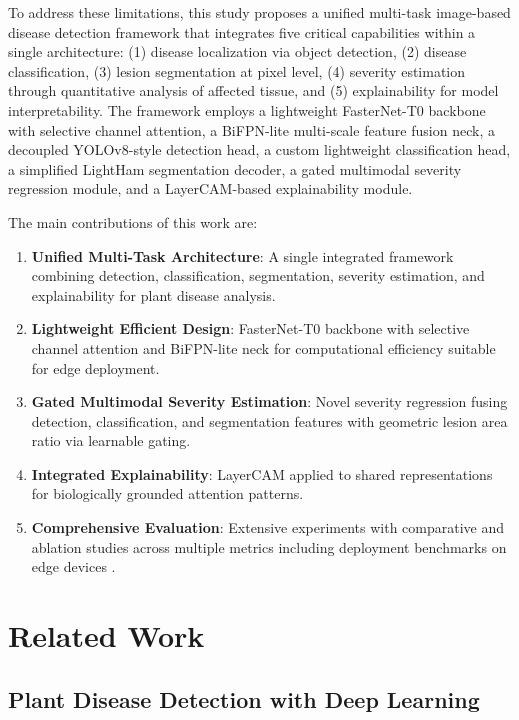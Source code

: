 \documentclass[10pt,a4paper,twocolumn]{article}
\begin{document}
To address these limitations, this study proposes a unified multi-task image-based disease detection framework that integrates five critical capabilities within a single architecture: (1) disease localization via object detection, (2) disease classification, (3) lesion segmentation at pixel level, (4) severity estimation through quantitative analysis of affected tissue, and (5) explainability for model interpretability. The framework employs a lightweight FasterNet-T0 backbone with selective channel attention, a BiFPN-lite multi-scale feature fusion neck, a decoupled YOLOv8-style detection head, a custom lightweight classification head, a simplified LightHam segmentation decoder, a gated multimodal severity regression module, and a LayerCAM-based explainability module.

The main contributions of this work are:

\begin{enumerate}
    \item \textbf{Unified Multi-Task Architecture}: A single integrated framework combining detection, classification, segmentation, severity estimation, and explainability for plant disease analysis.
    \item \textbf{Lightweight Efficient Design}: FasterNet-T0 backbone with selective channel attention and BiFPN-lite neck for computational efficiency suitable for edge deployment.
    \item \textbf{Gated Multimodal Severity Estimation}: Novel severity regression fusing detection, classification, and segmentation features with geometric lesion area ratio via learnable gating.
    \item \textbf{Integrated Explainability}: LayerCAM applied to shared representations for biologically grounded attention patterns.
    \item \textbf{Comprehensive Evaluation}: Extensive experiments with comparative and ablation studies across multiple metrics including deployment benchmarks on edge devices \cite{nyakuri2025tinylitenet}.
\end{enumerate}

\section{Related Work}
\label{sec:related}

\subsection{Plant Disease Detection with Deep Learning}
\end{document}

